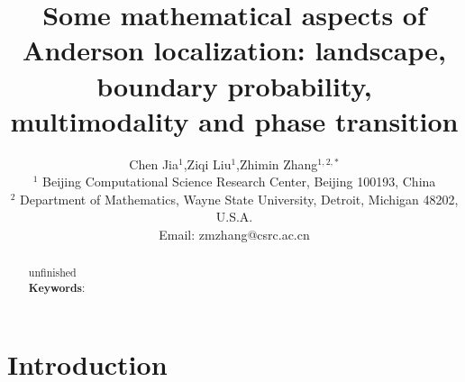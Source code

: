 \documentclass[a4paper,11pt]{article}
\newcommand{\paperfont}{\fontsize{11pt}{1.2\baselineskip}\selectfont}
\begin{document}
\theoremstyle{definition}
\makeatletter
\thm@headfont{\bf}
\makeatother
\newtheorem{definition}{Definition}
\newtheorem{example}{Example}
\newtheorem{theorem}{Theorem}
\newtheorem{lemma}{Lemma}
\newtheorem{corollary}{Corollary}
\newtheorem{remark}{Remark}
\newtheorem{proposition}{Proposition}

\lhead{}
\rhead{}
\lfoot{}
\rfoot{}

\renewcommand{\refname}{References}
\renewcommand{\figurename}{Fig.}
\renewcommand{\tablename}{Table}
\renewcommand{\proofname}{Proof}

\newcommand{\diag}{\mathrm{diag}}
\newcommand{\tr}{\mathrm{tr}}
\newcommand{\dnum}{\mathrm{d}}
\newcommand{\Enum}{\mathbb{E}}
\newcommand{\Pnum}{\mathbb{P}}
\newcommand{\Rnum}{\mathbb{R}}
\newcommand{\Cnum}{\mathbb{C}}
\newcommand{\Znum}{\mathbb{Z}}
\newcommand{\Nnum}{\mathbb{N}}
\newcommand{\abs}[1]{\left\vert#1\right\vert}
\newcommand{\set}[1]{\left\{#1\right\}}
\newcommand{\norm}[1]{\left\Vert#1\right\Vert}
\newcommand{\Q}{\boldsymbol{Q}}
\newcommand{\W}{\boldsymbol{W}}
\newcommand{\I}{\boldsymbol{I}}
\newcommand{\M}{\boldsymbol{M}}
\newcommand{\p}{\boldsymbol{p}}
\newcommand{\pai}{\boldsymbol{\pi}}

\title{Some mathematical aspects of Anderson localization: landscape, boundary probability, multimodality and phase transition}
\author{Chen Jia$^{1}$,\;\;\;Ziqi Liu$^{1}$,\;\;\;Zhimin Zhang$^{1,2,*}$\\
\footnotesize $^1$ Beijing Computational Science Research Center, Beijing 100193, China \\
\footnotesize $^2$ Department of Mathematics, Wayne State University, Detroit, Michigan 48202, U.S.A.\\
\footnotesize Email: zmzhang@csrc.ac.cn}
\date{}
\maketitle
\thispagestyle{empty}

\paperfont

\begin{abstract}
{\color{red} unfinished} \\

\noindent
\textbf{Keywords}:

\end{abstract}

\section{Introduction}
\end{document}
